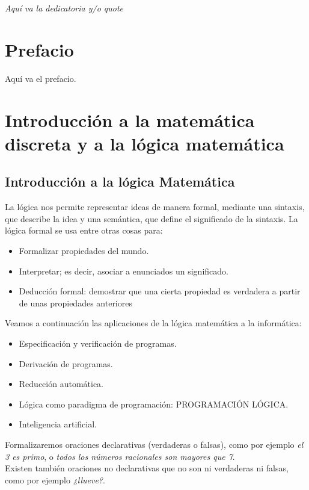 \documentclass[11pt, oneside]{book}
\theoremstyle{definition} %
\newcommand\blankpage{%
    \null
    \thispagestyle{empty}%
    \addtocounter{page}{-1}%
    \newpage}
\begin{document}
\blankpage

	\chapter*{}
\begin{flushright}
\textit{Aquí va la dedicatoria y/o quote}
\end{flushright}

	\chapter*{Prefacio}
	Aquí va el prefacio.
	
\mainmatter %

	\tableofcontents
	
	\chapter{Introducción a la matemática discreta y a la lógica matemática}
	\section{Introducción a la lógica Matemática}
	La lógica nos permite representar ideas de manera formal, mediante una sintaxis, que describe la idea y una semántica, que define el significado de la sintaxis.
	La lógica formal se usa entre otras cosas para:
	\begin{itemize}
	\item Formalizar propiedades del mundo.
	\item Interpretar; es decir, asociar a enunciados un significado.
	\item Deducción formal: demostrar que una cierta propiedad es verdadera a partir de unas propiedades anteriores
	\end{itemize}
	Veamos a continuación las aplicaciones de la lógica matemática a la informática:
	\begin{itemize}
	\item Especificación y verificación de programas.
	\item Derivación de programas.
	\item Reducción automática.
	\item Lógica como paradigma de programación: PROGRAMACIÓN LÓGICA.
	\item Inteligencia artificial.
	\end{itemize}
	Formalizaremos oraciones declarativas (verdaderas o falsas), como por ejemplo \textit{el 3 es primo}, o \textit{todos los números racionales son mayores que 7}.\\
	Existen también oraciones no declarativas que no son ni verdaderas ni falsas, como por ejemplo \textit{¿llueve?}.
\end{document}
